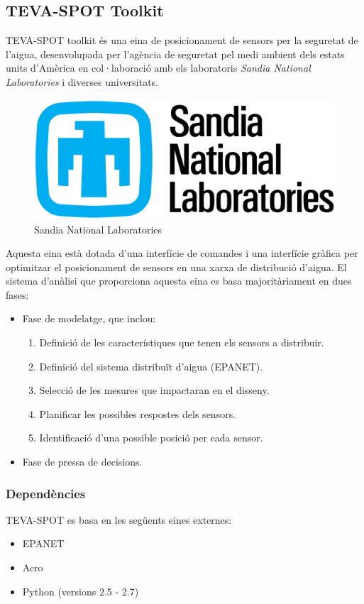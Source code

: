\documentclass[12pt]{article}
\begin{document}
\subsection{TEVA-SPOT Toolkit}
TEVA-SPOT toolkit és una eina de posicionament de sensors per la seguretat de l'aigua, desenvolupada per l'agència de seguretat pel medi ambient dels estats units d'Amèrica en col·laboració amb els laboratoris \textit{Sandia National Laboratories} i diverses universitats.

\begin{figure}[h!]
	\centering
	\includegraphics[scale=0.3]{imatges/snlabs.png}
	\caption{Sandia National Laboratories}
\end{figure}

Aquesta eina està dotada d'una interfície de comandes i una interfície gràfica per optimitzar el posicionament de sensors en una xarxa de distribució d'aigua. El sistema d'anàlisi que proporciona aquesta eina es basa majoritàriament en dues fases:
\begin{itemize}
	\item Fase de modelatge, que inclou:
	\begin{enumerate}
		\item Definició de les característiques que tenen els sensors a distribuir.
		\item Definició del sistema distribuït d'aigua (EPANET).
		\item Selecció de les mesures que impactaran en el disseny.
		\item Planificar les possibles respostes dels sensors.
		\item Identificació d'una possible posició per cada sensor.
	\end{enumerate}
	\item Fase de pressa de decisions.
\end{itemize}

\subsubsection{Dependències}
TEVA-SPOT es basa en les següents eines externes:
\begin{itemize}
	\item EPANET
	\item Acro
	\item Python (versions 2.5 - 2.7)
\end{itemize}
\end{document}
